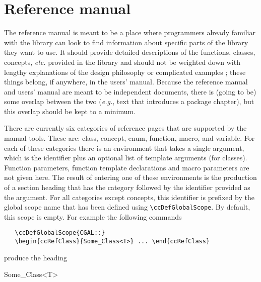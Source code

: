\section{Reference manual}
\label{sec:ref_manual}

The reference manual is meant to be a place where programmers already
familiar with the library can look to find information about specific
parts of the library they want to use.  It should provide detailed
descriptions of the functions, classes, concepts, {\em etc.} provided
in the library and should not be weighted down with lengthy explanations
of the design philosophy or complicated examples
;  these things belong,
if anywhere, in the
users' manual.  Because the reference manual and users' manual are meant
to be independent documents, there is (going to be) some overlap between 
the two ({\em e.g.}, text that introduces a package chapter),
but this overlap should be kept to a minimum.   

There are currently six categories of reference pages that are supported by 
the manual tools.  These are: class, concept, enum, function, macro, and 
variable.  For each of these categories there is an environment that takes
a single argument, which is the identifier plus an optional list of 
template arguments (for classes).  Function parameters, function template
declarations and macro parameters are not given here.  The result of entering
one of these environments is the production of a section heading that
has the category followed by the identifier provided as the argument.  
For all categories except concepts, this identifier is prefixed by the
global scope name that has been defined using \verb|\ccDefGlobalScope|.%
By default, this scope is empty.  For example the following commands
\begin{verbatim}
   \ccDefGlobalScope{CGAL::}
   \begin{ccRefClass}{Some_Class<T>} ... \end{ccRefClass}
\end{verbatim}

produce the heading

\ccAutoIndexingOff
\ccHtmlNoClassToc
\ccHtmlNoIndex
\begin{ccRefClass}{Some_Class<T>} \end{ccRefClass}
\ccAutoIndexingOn

